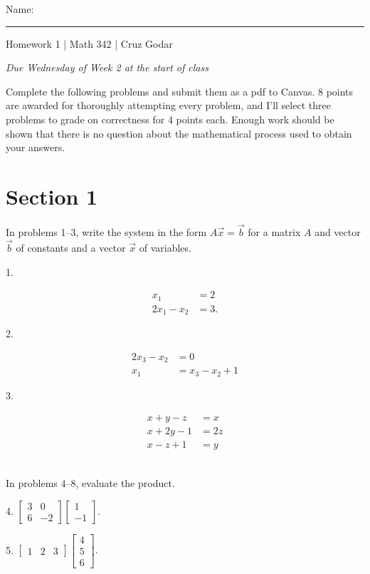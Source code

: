 \documentclass{article}
\begin{document}
\Large Name: \rule{2in}{0.15mm} \hfill Homework 1 | Math 342 | Cruz Godar \vspace{4pt} \normalsize

\textit{Due Wednesday of Week 2 at the start of class}

Complete the following problems and submit them as a pdf to Canvas. 8 points are awarded for thoroughly attempting every problem, and I'll select three problems to grade on correctness for 4 points each. Enough work should be shown that there is no question about the mathematical process used to obtain your answers.

\section{Section 1}

In problems 1--3, write the system in the form $A\vec{x} = \vec{b}$ for a matrix $A$ and vector $\vec{b}$ of constants and a vector $\vec{x}$ of variables.

1.

\begin{align*}
	x_1 &= 2\\
	2x_1 - x_2 &= 3.
\end{align*}

2.

\begin{align*}
	2x_3 - x_2 &= 0\\
	x_1 &= x_3 - x_2 + 1
\end{align*}

3.

\begin{align*}
	x + y - z &= x\\
	x + 2y - 1 &= 2z\\
	x - z + 1 &= y
\end{align*}

~\\

In problems 4--8, evaluate the product.

4. $\displaystyle \left[\begin{array}{cc}3& 0 \\ 6& -2\end{array}\right]\left[\begin{array}{c}1 \\ -1\end{array}\right].$

5. $\displaystyle \left[\begin{array}{ccc}1& 2& 3\end{array}\right]\left[\begin{array}{c}4 \\ 5 \\ 6\end{array}\right].$
\end{document}
